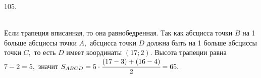 105. \begin{figure}[ht!]
\end{figure}\\
Если трапеция вписанная, то она равнобедренная. Так как абсцисса точки $B$ на 1 больше абсциссы точки $A,$ абсцисса точки $D$ должна быть на 1 больше абсциссы точки $C,$ то есть $D$ имеет координаты $(17;2).$ Высота трапеции равна $7-2=5,$ значит $S_{ABCD}=5\cdot\cfrac{(17-3)+(16-4)}{2}=65.$\newpage\noindent

